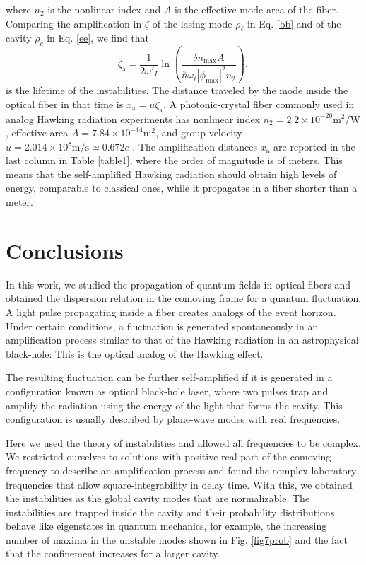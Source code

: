 \documentclass[aps,pra,reprint,amsmath,amssymb,showpacs,groupedaddress,floatfix]{revtex4-1}
\begin{document}
where $n_2$ is the nonlinear index and $A$ is the effective mode area of the fiber. Comparing the amplification in $\zeta$ of the lasing mode $\rho_\ell$ in Eq. \eqref{bb} and of the cavity $\rho_c$ in Eq. \eqref{ee}, we find that
\begin{equation}
\zeta_\text{a}=\frac{1}{2\omega'_{I}}\ln\left(\frac{\delta n_\text{max}A}{\hbar\omega_\ell|\phi_\text{max}|^2n_2}\right),
\end{equation}
is the lifetime of the instabilities. The distance traveled by the mode inside the optical fiber in that time is $x_\text{a}=u\zeta_\text{a}$. A photonic-crystal fiber commonly used in analog Hawking radiation experiments has nonlinear index $n_2=2.2\times10^{-20}\text{m}^2/\text{W}$ \cite{Agrawal2013}, effective area $A=7.84\times10^{-14} \text{m}^2$, and group velocity $u=2.014\times10^{8}\text{m}/\text{s}\simeq 0.672c$ \cite{Bermudez2016jp}. The amplification distances $x_\text{a}$ are reported in the last column in Table \ref{table1}, where the order of magnitude is of meters. This means that the self-amplified Hawking radiation should obtain high levels of energy, comparable to classical ones, while it propagates in a fiber shorter than a meter.

\section{Conclusions}\label{sec6conclu}
In this work, we studied the propagation of quantum fields in optical fibers and obtained the dispersion relation in the comoving frame for a quantum fluctuation. A light pulse propagating inside a fiber creates analogs of the event horizon. Under certain conditions, a fluctuation is generated spontaneously in an amplification process similar to that of the Hawking radiation in an astrophysical black-hole: This is the optical analog of the Hawking effect.

The resulting fluctuation can be further self-amplified if it is generated in a configuration known as optical black-hole laser, where two pulses trap and amplify the radiation using the energy of the light that forms the cavity. This configuration is usually described by plane-wave modes with real frequencies. 

Here we used the theory of instabilities and allowed all frequencies to be complex. We restricted ourselves to solutions with positive real part of the comoving frequency to describe an amplification process and found the complex laboratory frequencies that allow square-integrability in delay time. With this, we obtained the instabilities as the global cavity modes that are normalizable. The instabilities are trapped inside the cavity and their probability distributions behave like eigenstates in quantum mechanics, for example, the increasing number of maxima in the unstable modes shown in Fig. \ref{fig7prob} and the fact that the confinement increases for a larger cavity. 
\end{document}
